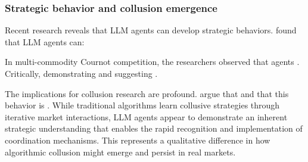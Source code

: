 \subsubsection*{Strategic behavior and collusion emergence}

Recent research reveals that LLM agents can develop strategic behaviors. \textcite[p.1]{lin_strategic_2025} found that LLM agents can:
    \begin{displayquote}
    \end{displayquote}
In multi-commodity Cournot competition, the researchers observed that agents  \parencite[p.2]{lin_strategic_2025}. Critically,  \parencite[p.6]{lin_strategic_2025} demonstrating  and suggesting  \parencite[p.6]{lin_strategic_2025}.

The implications for collusion research are profound. \textcite[p.8]{lin_strategic_2025} argue that  and that this behavior is . While traditional algorithms learn collusive strategies through iterative market interactions, LLM agents appear to demonstrate an inherent strategic understanding that enables the rapid recognition and implementation of coordination mechanisms. This represents a qualitative difference in how algorithmic collusion might emerge and persist in real markets.

% 
% 

